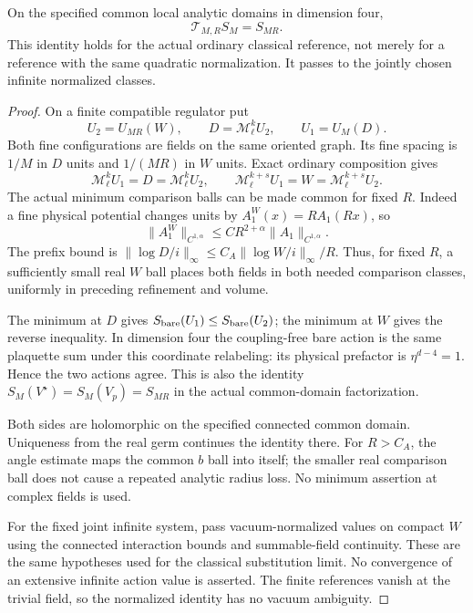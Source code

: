 \begin{lemma}
\label{eqr-reference-lemma}
On the specified common local analytic domains in dimension four,
\begin{equation}
                  \mathcal T_{M,R}S_M=S_{MR}.
 \label{eqr-reference-transport}
\end{equation}
This identity holds for the actual ordinary classical reference,
not merely for a reference with the same quadratic normalization.
It passes to the jointly chosen infinite normalized classes.
\end{lemma}
\begin{proof}
On a finite compatible regulator put
\[
 U_2=U_{MR}(W),\qquad D=\mathcal M_\ell^kU_2,\qquad U_1=U_M(D).
\]
Both fine configurations are fields on the same oriented graph.
Its fine spacing is $1/M$ in $D$ units and $1/(MR)$ in $W$ units.
Exact ordinary composition gives
\begin{equation}
 \mathcal M_\ell^kU_1=D=\mathcal M_\ell^kU_2,\qquad
 \mathcal M_\ell^{k+s}U_1=W=\mathcal M_\ell^{k+s}U_2.
 \label{eqr-two-constraints}
\end{equation}
The actual minimum comparison balls can be made common for fixed $R$.
Indeed a fine physical potential changes units by
$A_1^W(x)=R A_1(Rx)$, so
\begin{equation}
 \|A_1^W\|_{C^{1,\alpha}}
       \le CR^{2+\alpha}\|A_1\|_{C^{1,\alpha}}.
 \label{eqr-reference-rescaling}
\end{equation}
The prefix bound is
$\|\log D/i\|_\infty\le C_A\|\log W/i\|_\infty/R$.
Thus, for fixed $R$, a sufficiently small real $W$ ball places
both fields in both needed comparison classes, uniformly in
preceding refinement and volume.

The minimum at $D$ gives $S_{\rm bare}(U_1)\le S_{\rm bare}(U_2)$;
the minimum at $W$ gives the reverse inequality. In dimension four
the coupling-free bare action is the same plaquette sum under this
coordinate relabeling: its physical prefactor is
$\eta^{d-4}=1$. Hence the two actions agree. This is also the identity
$S_M(V^\star)=S_M(V_p)=S_{MR}$ in the actual common-domain
factorization.

Both sides are holomorphic on the specified connected common domain.
Uniqueness from the real germ continues the identity there.
For $R>C_A$, the angle estimate maps the common $b$ ball into itself;
the smaller real comparison ball does not cause a repeated analytic
radius loss. No minimum assertion at complex fields is used.

For the fixed joint infinite system, pass vacuum-normalized values on
compact $W$ using the connected interaction bounds and summable-field
continuity. These are the same hypotheses used for the classical
substitution limit. No convergence of an extensive infinite action
value is asserted. The finite references vanish at the trivial field,
so the normalized identity has no vacuum ambiguity.
\end{proof}

